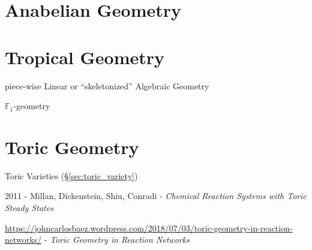


\section{Anabelian Geometry}\label{sec:anabelian_geometry}

\section{Tropical Geometry}\label{sec:tropical_geometry}

piece-wise Linear or ``skeletonized'' Algebraic Geometry

\fist $\mathbb{F}_1$-geometry



\section{Toric Geometry}\label{sec:toric_geometry}

Toric Varieties (\S\ref{sec:toric_variety})

2011 - Millan, Dickenstein, Shiu, Conradi - \emph{Chemical Reaction Systems with
  Toric Steady States}

\url{https://johncarlosbaez.wordpress.com/2018/07/03/toric-geometry-in-reaction-networks/}
- \emph{Toric Geometry in Reaction Networks}
